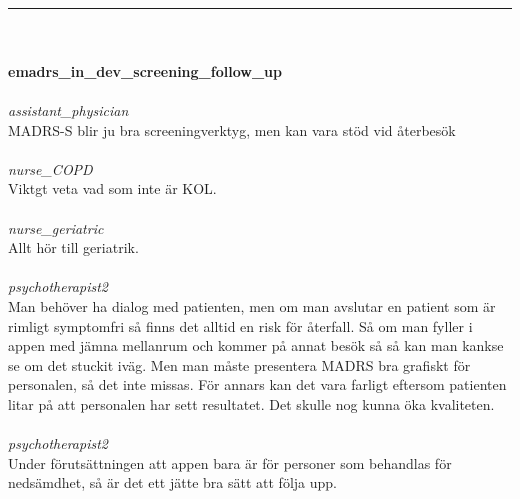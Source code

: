 \documentclass[12pt,a4paper,oneside]{article}
\begin{document}
\ \vspace{.66em}\\
\hrule
\ \vspace{.33em}\\
\ \\{\bf emadrs\_in\_dev\_screening\_follow\_up }
\\\ \\%
 { \it assistant\_physician %
}\\ 
MADRS-S blir ju bra screeningverktyg, men kan vara st{\"o}d vid {\aa}terbes{\"o}k %
\ \\\ \\
 { \it   nurse\_COPD %
}\\ 
Viktgt veta vad som inte {\"a}r KOL. %
\ \\\ \\
 { \it   nurse\_geriatric %
}\\ 
Allt h{\"o}r till geriatrik.  %
\ \\\ \\
 { \it   psychotherapist2 %
}\\ 
Man beh{\"o}ver ha dialog med patienten, men om man avslutar en patient som {\"a}r rimligt symptomfri s{\aa} finns det alltid en risk f{\"o}r {\aa}terfall. S{\aa} om man fyller i appen med j{\"a}mna mellanrum och kommer p{\aa} annat bes{\"o}k s{\aa} s{\aa} kan man kankse se om det stuckit iv{\"a}g. Men man m{\aa}ste presentera MADRS bra grafiskt f{\"o}r personalen, s{\aa} det inte missas. F{\"o}r annars kan det vara farligt eftersom patienten litar p{\aa} att personalen har sett resultatet. Det skulle nog kunna {\"o}ka kvaliteten.  %
\ \\\ \\
 { \it   psychotherapist2 %
}\\ 
Under f{\"o}ruts{\"a}ttningen att appen bara {\"a}r f{\"o}r personer som behandlas f{\"o}r neds{\"a}mdhet, s{\aa} {\"a}r det ett j{\"a}tte bra s{\"a}tt att f{\"o}lja upp. %
\end{document}
